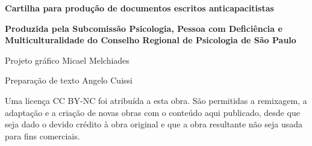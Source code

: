 \begin{CreditoInstitucional}
\begin{center}  %

\setasuspacing{\SingleSpacing}  %

\color{crp1}      %
\footnotesize     %
\textbf{Cartilha para produção de documentos escritos anticapacitistas}
\vspace{0.2\baselineskip}  %

\color{black}     %
\scriptsize       %
\textbf{Produzida pela Subcomissão Psicologia, Pessoa com Deficiência e Multiculturalidade do Conselho Regional de Psicologia de São Paulo}

\fontebook        %
\color{crp1}Projeto gráfico \color{black}Micael Melchiades

\vspace{-0.618\baselineskip}  %
\color{crp1}Preparação de texto \color{black}Angelo Cuissi

\vspace*{1.618\baselineskip}  %



\scriptsize  %
Uma licença CC BY-NC foi atribuída a esta obra. São permitidas a remixagem,
a adaptação e a criação de novas obras com o conteúdo aqui publicado,
desde que seja dado o devido crédito à obra original e que a obra resultante
não seja usada para fins comerciais.

\end{center}             %
\end{CreditoInstitucional}  %

\vspace*{\fill}  %
